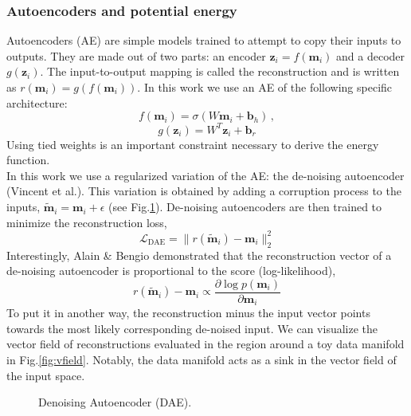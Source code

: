 \documentclass[12pt]{report}
\begin{document}
\subsubsection*{Autoencoders and potential energy}
Autoencoders (AE) are simple models trained to attempt to copy their inputs to outputs. They are made out of two parts: an encoder $\textbf{z}_i = f(\textbf{m}_i)$ and a decoder $g(\textbf{z}_i)$. The input-to-output mapping is called the reconstruction and is written as $r(\textbf{m}_i) = g(f(\textbf{m}_i))$. In this work we use an AE of the following specific architecture:
\begin{equation}
f(\textbf{m}_i) = \sigma(W\textbf{m}_i + \textbf{b}_h)\,,
\label{eq:ae-arch1}
\end{equation}
\begin{equation}
g(\textbf{z}_i) = W^T\textbf{z}_i + \textbf{b}_r
\label{eq:ae-arch2}
\end{equation}
Using tied weights is an important constraint necessary to derive the energy function. \\

\indent In this work we use a regularized variation of the AE: the de-noising autoencoder (Vincent et al.\cite{dae-vincent}). This variation is obtained by adding a corruption process to the inputs, $\tilde{\textbf{m}}_i = \textbf{m}_i + \epsilon$ (see Fig.\ref{fig:denoising-ae}). De-noising autoencoders are then trained to minimize the reconstruction loss,
\begin{equation}
\mathcal{L}_{\text{DAE}} = \lVert r(\tilde{\textbf{m}}_i) - \textbf{m}_i \rVert_2^2
\end{equation}
Interestingly, Alain \& Bengio\cite{alainbengio} demonstrated that the reconstruction vector of a de-noising autoencoder is proportional to the score (log-likelihood),
\begin{equation}
r(\tilde{\textbf{m}}_i) - \textbf{m}_i \propto \frac{\partial \log p(\textbf{m}_i)}{\partial \textbf{m}_i}
\label{eq:score}
\end{equation}
To put it in another way, the reconstruction minus the input vector points towards the most likely corresponding de-noised input. We can visualize the vector field of reconstructions evaluated in the region around a toy data manifold  in Fig.\ref{fig:vfield}. Notably, the data manifold acts as a sink in the vector field of the input space. \\
\begin{figure}[!htbp]
  \centering
  \hfill
  \caption{Denoising Autoencoder (DAE).}
  \label{fig:denoising-ae}
\end{figure}
\end{document}
